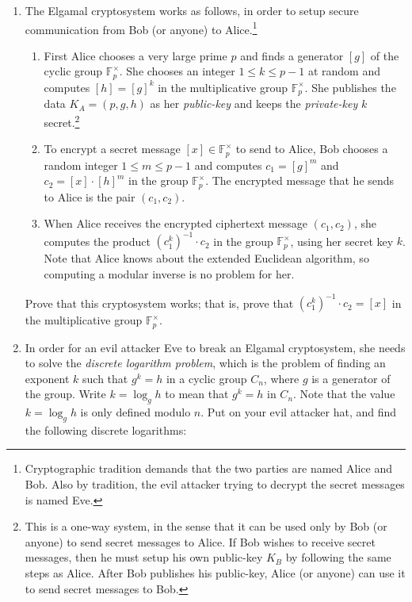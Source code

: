 \documentclass[11pt]{article}
\newenvironment{problems}
{
 \begin{enumerate}[topsep=1pt,itemsep=0pt,parsep=2pt,leftmargin=0.6cm,%
 label={\arabic*.}, ref=\arabic*] \small
}
{
 \end{enumerate}
}
\theoremstyle{definition}
\newcommand{\F}{{\mathbb F}}
\begin{document}
\begin{problems}
\item The Elgamal cryptosystem works as
  follows, in order to setup secure communication from Bob (or anyone)
  to Alice.\footnote{Cryptographic tradition demands that the two
    parties are named Alice and Bob. Also by tradition, the evil
    attacker trying to decrypt the secret messages is named Eve.}
  \begin{enumerate}
  \item First Alice chooses a very large prime $p$ and finds a
    generator $[g]$ of the cyclic group $\F_p^\times$. She chooses an
    integer $1 \le k \le p-1$ at random and computes $[h] = [g]^k$ in
    the multiplicative group $\F_p^\times$. She publishes the data
    $K_A = (p,g,h)$ as her \emph{public-key} and keeps the
    \emph{private-key} $k$ secret.\footnote{This is a one-way system,
      in the sense that it can be used only by Bob (or anyone) to send
      secret messages to Alice. If Bob wishes to receive secret
      messages, then he must setup his own public-key $K_B$ by
      following the same steps as Alice. After Bob publishes his
      public-key, Alice (or anyone) can use it to send secret messages
      to Bob.}

  \item To encrypt a secret message $[x] \in \F_{p}^\times$ to send to
    Alice, Bob chooses a random integer $1 \le m \le p-1$ and computes
    $c_1 = [g]^m$ and $c_2 = [x] \cdot [h]^m$ in the group
    $\F_p^\times$. The encrypted message that he sends to Alice is the
    pair $(c_1, c_2)$.

  \item When Alice receives the encrypted ciphertext message $(c_1,
    c_2)$, she computes the product $(c_1^k)^{-1} \cdot c_2$ in the
    group $\F_p^\times$, using her secret key $k$. Note that Alice
    knows about the extended Euclidean algorithm, so computing a
    modular inverse is no problem for her.
  \end{enumerate}
  Prove that this cryptosystem works; that is, prove that
  $(c_1^k)^{-1} \cdot c_2 = [x]$ in the multiplicative group
  $\F_p^\times$.


\item In order for an evil attacker Eve to break an Elgamal
  cryptosystem, she needs to solve the \emph{discrete logarithm
    problem}, which is the problem of finding an exponent $k$ such
  that $g^k = h$ in a cyclic group $C_n$, where $g$ is a generator of
  the group. Write $k = \log_g h$ to mean that $g^k = h$ in
  $C_n$. Note that the value $k = \log_g h$ is only defined modulo
  $n$. Put on your evil attacker hat, and find the following discrete
  logarithms:


\end{problems}
\end{document}
